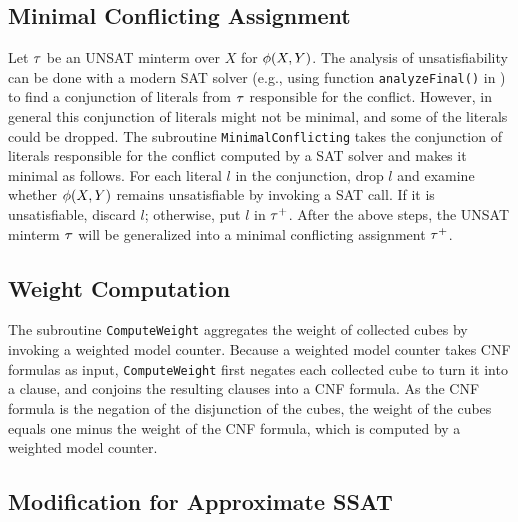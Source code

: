 \subsection{Minimal Conflicting Assignment}
Let $\tau$ be an UNSAT minterm over $X$ for $\phi(X,Y)$.
The analysis of unsatisfiability can be done with a modern SAT solver (e.g., using function \texttt{analyzeFinal()} in \minisat) to find a conjunction of literals from $\tau$ responsible for the conflict.
However, in general this conjunction of literals might not be minimal,
and some of the literals could be dropped.
The subroutine \texttt{MinimalConflicting} takes the conjunction of literals responsible for the conflict computed by a SAT solver and makes it minimal as follows.
For each literal $l$ in the conjunction,
drop $l$ and examine whether $\phi(X,Y)$ remains unsatisfiable by invoking a SAT call.
If it is unsatisfiable, discard $l$; otherwise, put $l$ in $\tau^+$.
After the above steps, the UNSAT minterm $\tau$ will be generalized into a minimal conflicting assignment $\tau^+$.

\subsection{Weight Computation}
The subroutine \texttt{ComputeWeight} aggregates the weight of collected cubes by invoking a weighted model counter.
Because a weighted model counter takes CNF formulas as input,
\texttt{ComputeWeight} first negates each collected cube to turn it into a clause,
and conjoins the resulting clauses into a CNF formula.
As the CNF formula is the negation of the disjunction of the cubes,
the weight of the cubes equals one minus the weight of the CNF formula,
which is computed by a weighted model counter.

\subsection{Modification for Approximate SSAT}
\label{sect:ressat-approximate}

